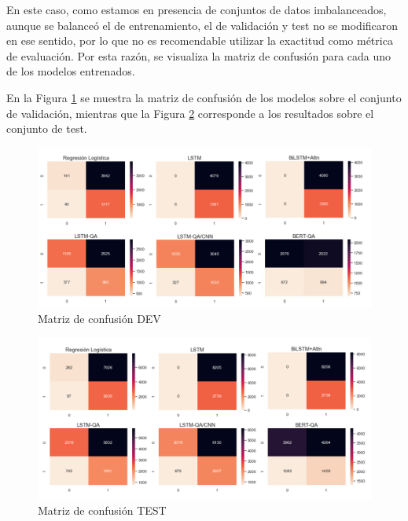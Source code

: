En este caso, como estamos en presencia de conjuntos de datos imbalanceados, aunque se balanceó el de entrenamiento, el de validación y test no se modificaron en ese sentido, por lo que no es recomendable utilizar la exactitud como métrica de evaluación. Por esta razón, se visualiza la matriz de confusión para cada uno de los modelos entrenados.

En la Figura \ref{dev_cm} se muestra la matriz de confusión de los modelos sobre el conjunto de validación, mientras que la Figura \ref{test_cm} corresponde a los resultados sobre el conjunto de test.

\begin{figure}[!tb]
  \begin{center}
    \includegraphics[angle=0, width=1\textwidth]{Graphics/dev_cm.png}
  \end{center}
    \caption{Matriz de confusión DEV}\label{dev_cm}
\end{figure}

\begin{figure}[!ht]
  \begin{center}
    \includegraphics[angle=0, width=1\textwidth]{Graphics/test_cm.png}
  \end{center}
    \caption{Matriz de confusión TEST}\label{test_cm}
\end{figure}

